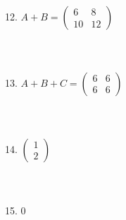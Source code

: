 \documentclass[fleqn]{article}
\begin{document}
12. \(A + B = \begin{pmatrix} 6 & 8 \\ 10 & 12 \end{pmatrix}\) \\\\\\\\
13. \(A + B + C = \begin{pmatrix} 6 & 6 \\ 6 & 6 \end{pmatrix}\) \\\\\\\\
14. \(\begin{pmatrix} 1 \\ 2 \end{pmatrix}\) \\\\\\\\
15. \(0\) \\\\\\\\
      
        
\end{document}
